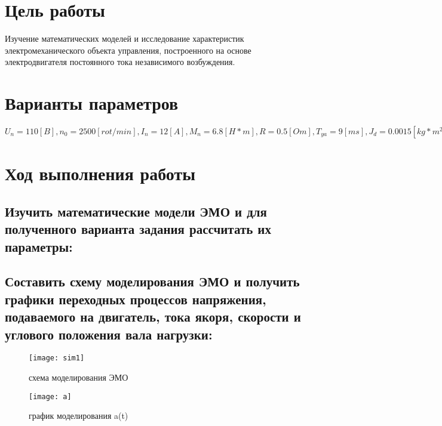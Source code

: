 







\section{Цель работы}
Изучение математических моделей и исследование характеристик электромеханического объекта управления, построенного на основе электродвигателя постоянного тока независимого возбуждения.


\section{Варианты параметров}

$U_n = 110 [B], n_0 = 2500 [rot/min], I_n = 12 [A], M_n = 6.8 [H*m], R = 0.5 [Om], T_{ya} = 9 [ms], J_d=0.0015 [kg*m^2], T_y=5[ms], i_p = 40, J_m = 1.2[kg*m^2]$


\section{Ход выполнения работы}
\subsection{Изучить математические модели ЭМО и для полученного варианта задания рассчитать их параметры:}
\subsection{Составить схему моделирования ЭМО и получить графики переходных процессов напряжения, подаваемого на двигатель, тока якоря, скорости и углового положения вала нагрузки:}


\begin{figure}[H]
	\begin{center}
		\texttt{[image: sim1]}
		\caption{схема моделирования ЭМО} 
		\label{pic:pic_1} %
	\end{center}
\end{figure}

\begin{figure}[H]
	\begin{center}
		\texttt{[image: a]}
		\caption{график моделирования a(t)} 
		\label{pic:pic_2} %
	\end{center}
\end{figure}

